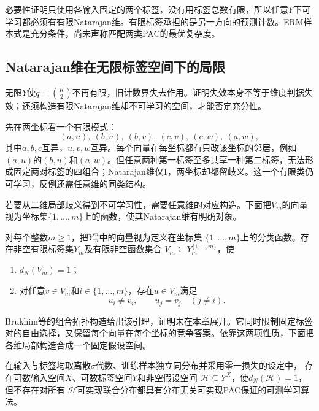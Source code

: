 必要性证明只使用各输入固定的两个标签，没有用标签总数有限，所以任意$Y$下可学习都必须有有限Natarajan维。有限标签承担的是另一方向的预测计数。ERM样本式是充分条件，尚未声称匹配两类PAC的最优复杂度。

\subsection{Natarajan维在无限标签空间下的局限}
\label{sec:multiclass-erm-limitations}

无限$Y$使$q=\binom K2$不再有限，旧计数界失去作用。证明失效本身不等于维度判据失效；还须构造有限Natarajan维却不可学习的空间，才能否定充分性。

先在两坐标看一个有限模式：
\[
 (a,u),\ (b,u),\ (b,v),\ (c,v),\ (c,w),\ (a,w),
\]
其中$a,b,c$互异，$u,v,w$互异。每个向量在每坐标都有只改该坐标的邻居，例如$(a,u)$的$(b,u)$和$(a,w)$。但任意两种第一标签至多共享一种第二标签，无法形成固定两对标签的四组合；Natarajan维仅1，两坐标却都留歧义。这一个有限类仍可学习，反例还需任意维的同类结构。

若要从二维局部歧义得到不可学习性，需要任意维的对应构造。下面把$V_m$的向量视为坐标集$\{1,\ldots,m\}$上的函数，使其Natarajan维有明确对象。

\begin{lemma}[低Natarajan维的局部邻接构造]
\label{lem:low-natarajan-pseudocubes}
对每个整数$m\geq1$，把$Y_m^m$中的向量视为定义在坐标集
$\{1,\ldots,m\}$上的分类函数。存在非空有限标签集$Y_m$及有限非空函数集合
$V_m\subseteq Y_m^{\{1,\ldots,m\}}$，使
\begin{enumerate}
 \item $d_N(V_m)=1$；
 \item 对任意$v\in V_m$和$i\in\{1,\ldots,m\}$，存在$u\in V_m$满足
 \[
 u_i\neq v_i,\qquad u_j=v_j\quad(j\neq i).
 \]
\end{enumerate}
\end{lemma}

Brukhim等的组合拓扑构造给出该引理，证明未在本章展开。它同时限制固定标签对的自由选择，又保留每个向量在每个坐标的竞争答案。依靠这两项性质，下面把各维局部构造合成一个固定假设空间。

\begin{theorem}[无限标签下有限Natarajan维并不充分]
\label{thm:natarajan-infinite-counterexample}
在输入与标签均取离散$\sigma$代数、训练样本独立同分布并采用零一损失的设定中，
存在可数输入空间$X$、可数标签空间$Y$和非空假设空间
$\mathcal H\subseteq Y^X$，使$d_N(\mathcal H)=1$，但不存在对所有
$\mathcal H$可实现联合分布都具有分布无关可实现PAC保证的可测学习算法。
\end{theorem}

